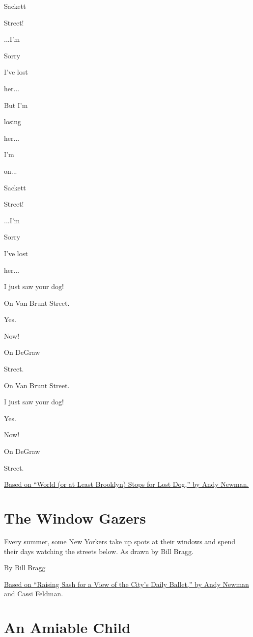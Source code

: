 Sackett

Street!

...I'm

Sorry

I've lost

her...

But I'm

losing

her...

I'm

on...

Sackett

Street!

...I'm

Sorry

I've lost

her...

I just saw your dog!

On Van Brunt Street.

Yes.

Now!

On DeGraw

Street.

On Van Brunt Street.

I just saw your dog!

Yes.

Now!

On DeGraw

Street.

\href{https://www.nytimes3xbfgragh.onion/2016/11/13/nyregion/world-or-at-least-brooklyn-stops-for-lost-dog.html}{Based
on ``World (or at Least Brooklyn) Stops for Lost Dog,'' by Andy Newman.}

\hypertarget{the-window-gazers}{%
\section{The Window Gazers}\label{the-window-gazers}}

Every summer, some New Yorkers take up spots at their windows and spend
their days watching the streets below. As drawn by Bill Bragg.

By Bill Bragg

\href{http://www.nytimes3xbfgragh.onion/2007/08/18/nyregion/18summer.html}{Based
on ``Raising Sash for a View of the City's Daily Ballet,'' by Andy
Newman and Cassi Feldman.}

\hypertarget{an-amiable-child}{%
\section{An Amiable Child}\label{an-amiable-child}}

